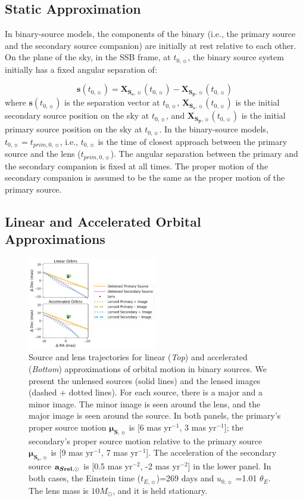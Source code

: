 \documentclass[twocolumn]{aastex701}
\newcommand{\vect}[1]{\boldsymbol{#1}}
\newcommand{\accSsec}{\bold{a}_{\boldsymbol{S\mathrm{rel}},\sun}}
\newcommand{\tnot}{t_{0,\sun}}
\newcommand{\tE}{t_{E,\sun}}
\newcommand{\thetaE}{\theta_E}
\newcommand{\uo}{u_{0,\sun}}
\newcommand{\musvec}{\vect{\mu}_{\boldsymbol{S},\sun}}
\newcommand{\mussvec}{\vect{\mu}_{\boldsymbol{S_s},\sun}}
\newcommand{\Xspvec}{\vect{X}_{\boldsymbol{S_p},\sun}}
\newcommand{\Xssvec}{\vect{X}_{\boldsymbol{S_s},\sun}}
\newcommand{\tpnot}{t_{prim,0,\sun}}
\begin{document}
\subsection{Static Approximation}
\label{sec:binsources_static}

In binary-source models, the components of the binary (i.e., the primary source and the secondary source companion) are initially at rest relative to each other. On the plane of the sky, in the SSB frame, at $\tnot$, the binary source system initially has a fixed angular separation of:

\begin{equation}
    \vect{s}(\tnot) = \Xssvec(\tnot) - \Xspvec(\tnot)
\end{equation}
%
where $\vect{s}(\tnot)$ is the separation vector at $\tnot$, $\Xssvec(\tnot)$ is the initial secondary source position on the sky at $\tnot$, and $\Xspvec (\tnot)$ is the initial primary source position on the sky at $\tnot$. In the binary-source models, $\tnot = \tpnot$, i.e., $\tnot$ is the time of closest approach between the primary source and the lens ($\tpnot$). The angular separation between the primary and the secondary companion is fixed at all times. The proper motion of the secondary companion is assumed to be the same as the proper motion of the primary source. 

\subsection{Linear and Accelerated Orbital Approximations}
\label{sec:binsources_lin}

\begin{figure}
    \centering
    \includegraphics[width=0.5\textwidth]{figures/linorbs.png}
    \caption{Source and lens trajectories for linear (\emph{Top}) and accelerated (\emph{Bottom}) approximations of orbital motion in binary sources. We present the unlensed sources (solid lines) and the lensed images (dashed + dotted lines). For each source, there is a major and a minor image. The minor image is seen around the lens, and the major image is seen around the source. In both panels, the primary's proper source motion $\musvec$ is [6 mas yr$^{-1}$, 3 mas yr$^{-1}$]; the secondary's proper source motion relative to the primary source $\mussvec$ is [9 mas yr$^{-1}$, 7 mas yr$^{-1}$]. The acceleration of the secondary source $\accSsec$ is [0.5  mas yr$^{-2}$, -2  mas yr$^{-2}$] in the lower panel. In both cases, the Einstein time ($\tE$)=269 days and $\uo$ =1.01 $\thetaE$. The lens mass is $10 M_\odot$, and it is held stationary.}
    
    \label{fig:bspl_linacc}
\end{figure}
\end{document}
